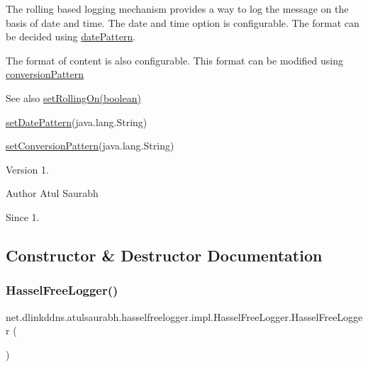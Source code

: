 The rolling based logging mechanism provides a way to log the message on the basis of date and time. The date and time option is configurable. The format can be decided using \mbox{\hyperlink{}{date\+Pattern}}. 

The format of content is also configurable. This format can be modified using \mbox{\hyperlink{}{conversion\+Pattern}}

\begin{DoxySeeAlso}{See also}
\mbox{\hyperlink{classnet_1_1dlinkddns_1_1atulsaurabh_1_1hasselfreelogger_1_1impl_1_1_hassel_free_logger_a9ef8b4f7c9615f50c03f168f1b949f64}{set\+Rolling\+On(boolean)}} 

\mbox{\hyperlink{classnet_1_1dlinkddns_1_1atulsaurabh_1_1hasselfreelogger_1_1impl_1_1_hassel_free_logger_a72529568d69eea543b2238a466cedf8d}{set\+Date\+Pattern}}(java.\+lang.\+String) 

\mbox{\hyperlink{classnet_1_1dlinkddns_1_1atulsaurabh_1_1hasselfreelogger_1_1impl_1_1_hassel_free_logger_a23a1e3b5c56528e197c7eb3832e7c69e}{set\+Conversion\+Pattern}}(java.\+lang.\+String)
\end{DoxySeeAlso}
\begin{DoxyVersion}{Version}
1. 
\end{DoxyVersion}
\begin{DoxyAuthor}{Author}
Atul Saurabh 
\end{DoxyAuthor}
\begin{DoxySince}{Since}
1. 
\end{DoxySince}


\subsection{Constructor \& Destructor Documentation}
\mbox{\label{classnet_1_1dlinkddns_1_1atulsaurabh_1_1hasselfreelogger_1_1impl_1_1_hassel_free_logger_a603e83e38bc2c011dd3e5edf074acb1d}} 
\subsubsection{\texorpdfstring{Hassel\+Free\+Logger()}{HasselFreeLogger()}\hspace{0.1cm}{\footnotesize\ttfamily [1/2]}}
{\footnotesize\ttfamily net.\+dlinkddns.\+atulsaurabh.\+hasselfreelogger.\+impl.\+Hassel\+Free\+Logger.\+Hassel\+Free\+Logger (\begin{DoxyParamCaption}{ }\end{DoxyParamCaption})}

